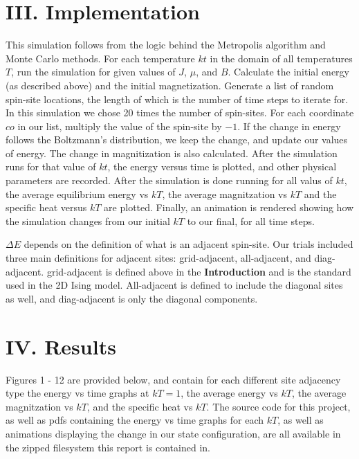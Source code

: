 \documentclass{article}
\begin{document}
\section*{III. Implementation}
\indent \indent This simulation follows from the logic behind the Metropolis algorithm
and Monte Carlo methods. For each temperature $kt$ in the domain of all
temperatures $T$,  run the simulation for given values of $J$, $\mu$, and $B$.
Calculate the initial energy (as described above) and the initial magnetization.
Generate a list of random spin-site locations, the length of which is the number
of time steps to iterate for. In this simulation we chose 20 times the number of 
spin-sites. For each coordinate $co$ in our list, multiply the value of the
spin-site by $-1$. If the change in energy follows the Boltzmann's distribution,
we keep the change, and update our values of energy. The change in magnitization 
is also calculated. After the simulation runs for that value of $kt$, the energy
versus time is plotted, and other physical parameters are recorded. After the
simulation is done running for all valus of $kt$, the average equilibrium energy
vs $kT$, the average magnitzation vs $kT$ and the specific heat versus $kT$ are
plotted. Finally, an animation is rendered showing how the simulation changes from
our initial $kT$ to our final, for all time steps.

\indent $\Delta E$ depends on the definition of what is an adjacent spin-site. 
Our trials included three main definitions for adjacent sites: grid-adjacent,
all-adjacent, and diag-adjacent. grid-adjacent is defined above in the 
\textbf{Introduction} and is the standard used in the 2D Ising model. All-adjacent
is defined to include the diagonal sites as well, and diag-adjacent is only 
the diagonal components.
\section*{IV. Results}
\indent \indent Figures 1 - 12 are provided below, and contain for each different site adjacency type
the energy vs time graphs at $kT = 1$, the average energy vs $kT$, the average 
magnitzation vs $kT$, and the specific heat vs $kT$. The source code for this 
project, as well as pdfs containing the energy vs time graphs for each $kT$, as 
well as animations displaying the change in our state configuration, are all
available in the zipped filesystem this report is contained in.
\end{document}
